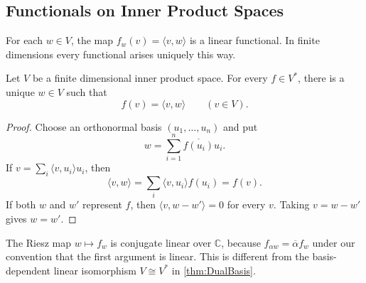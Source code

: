 \subsection{Functionals on Inner Product Spaces}

For each $w\in V$, the map $f_w(v)=\langle v,w\rangle$ is a linear functional. In finite dimensions every functional arises uniquely this way.

\begin{Theorem}\label{thm:RieszFinite}
Let $V$ be a finite dimensional inner product space. For every $f\in V^*$, there is a unique $w\in V$ such that
\begin{equation*}
f(v)=\langle v,w\rangle\qquad(v\in V).
\end{equation*}
\end{Theorem}
\begin{proof}
Choose an orthonormal basis $(u_1,\ldots,u_n)$ and put
\begin{equation*}
w=\sum_{i=1}^n\overline{f(u_i)}u_i.
\end{equation*}
If $v=\sum_i\langle v,u_i\rangle u_i$, then
\begin{equation*}
\langle v,w\rangle=\sum_i\langle v,u_i\rangle f(u_i)=f(v).
\end{equation*}
If both $w$ and $w'$ represent $f$, then $\langle v,w-w'\rangle=0$ for every $v$. Taking $v=w-w'$ gives $w=w'$.
\end{proof}

\begin{Remark*}
The Riesz map $w\mapsto f_w$ is conjugate linear over $\mathbb C$, because $f_{\alpha w}=\overline\alpha f_w$ under our convention that the first argument is linear. This is different from the basis-dependent linear isomorphism $V\cong V^*$ in \cref{thm:DualBasis}.
\end{Remark*}
